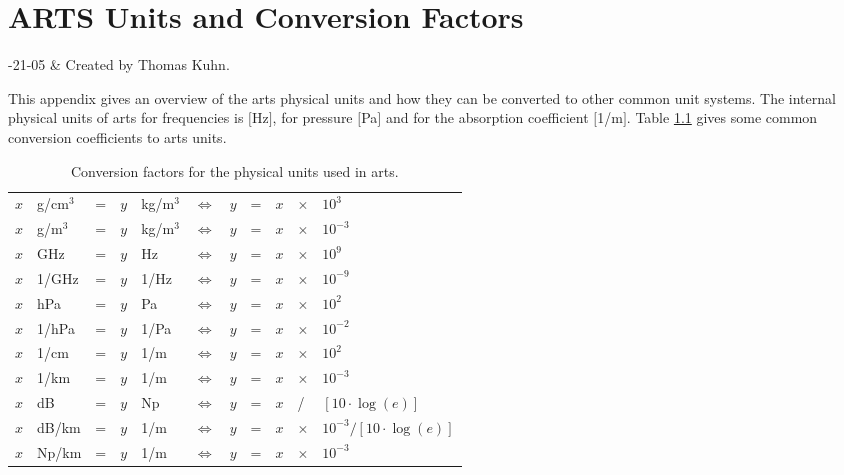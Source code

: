 \chapter{ARTS Units and Conversion Factors}
 \label{app:arts_units}


-21-05 & Created by Thomas Kuhn. \\
\stophistory

 This appendix gives an overview of the arts physical units 
 and how they can be converted to other common unit systems.
 The internal physical units of arts for frequencies is $[$Hz$]$,
 for pressure $[$Pa$]$ and for the absorption coefficient $[$1/m$]$.
 Table \ref{tab:app_arts_units} gives some common conversion
 coefficients to arts units.

\begin{table}
  \begin{center}
  \begin{tabular}{lllllllllll}
   \hline
   $x$ & g/cm$^3$ & = & $y$ & kg/m$^3$ & $\Leftrightarrow$ & $y$ & = &
   $x$ & $\times$ & $10^{3}$ \\
   $x$ & g/m$^3$  & = & $y$ & kg/m$^3$ & $\Leftrightarrow$ & $y$ & = & $x$ & $\times$ & $10^{-3}$ \\
   $x$ & GHz      & = & $y$ & Hz       & $\Leftrightarrow$ & $y$ & = & $x$ & $\times$ & $ 10^{9}$ \\
   $x$ & 1/GHz    & = & $y$ & 1/Hz     & $\Leftrightarrow$ & $y$ & = & $x$ & $\times$ & $10^{-9}$ \\
   $x$ & hPa      & = & $y$ & Pa       & $\Leftrightarrow$ & $y$ & = & $x$ & $\times$ & $10^{2}$ \\
   $x$ & 1/hPa    & = & $y$ & 1/Pa     & $\Leftrightarrow$ & $y$ & = & $x$ & $\times$ & $10^{-2}$ \\
   $x$ & 1/cm     & = & $y$ & 1/m      & $\Leftrightarrow$ & $y$ & = & $x$ & $\times$ & $10^{2}$ \\
   $x$ & 1/km     & = & $y$ & 1/m      & $\Leftrightarrow$ & $y$ & = & $x$ & $\times$ & $10^{-3}$ \\
   $x$ & dB       & = & $y$ & Np       & $\Leftrightarrow$ & $y$ & = & $x$ & / & $[10\cdot\log{(e)}]$ \\
   $x$ & dB/km    & = & $y$ & 1/m      & $\Leftrightarrow$ & $y$ & = &
   $x$ & $\times$ & $10^{-3} / [10\cdot\log{(e)}]$ \\
   $x$ & Np/km    & = & $y$ & 1/m      & $\Leftrightarrow$ & $y$ & = & $x$ & $\times$ & $10^{-3}$ \\
   \hline
 \end{tabular}
 \end{center}
 \caption{Conversion factors for the physical units used in arts.}
 \label{tab:app_arts_units}
\end{table}

